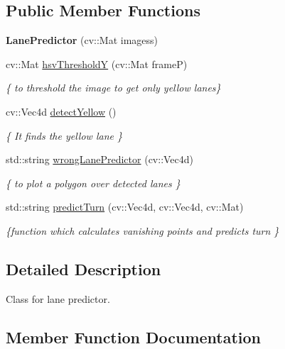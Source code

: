 \subsection*{Public Member Functions}
\begin{DoxyCompactItemize}
\item 
{\bfseries Lane\+Predictor} (cv\+::\+Mat imagess)\hypertarget{classLanePredictor_a57bc13d1b363fad1de2336356377e8ff}{}\label{classLanePredictor_a57bc13d1b363fad1de2336356377e8ff}

\item 
cv\+::\+Mat \hyperlink{classLanePredictor_ada11760da395c1d2f9e6117212659742}{hsv\+ThresholdY} (cv\+::\+Mat frameP)
\begin{DoxyCompactList}\small\item\em \{ to threshold the image to get only yellow lanes\} \end{DoxyCompactList}\item 
cv\+::\+Vec4d \hyperlink{classLanePredictor_a10bd6de18ad3ffb3f10c2385e32dfdee}{detect\+Yellow} ()
\begin{DoxyCompactList}\small\item\em \{ It finds the yellow lane \} \end{DoxyCompactList}\item 
std\+::string \hyperlink{classLanePredictor_ac930fa52cdede9afa25bbf7cafd8c6b5}{wrong\+Lane\+Predictor} (cv\+::\+Vec4d)
\begin{DoxyCompactList}\small\item\em \{ to plot a polygon over detected lanes \} \end{DoxyCompactList}\item 
std\+::string \hyperlink{classLanePredictor_a9b72c2dfa77992f7f8e229c3a67103f7}{predict\+Turn} (cv\+::\+Vec4d, cv\+::\+Vec4d, cv\+::\+Mat)
\begin{DoxyCompactList}\small\item\em \{function which calculates vanishing points and predicts turn \} \end{DoxyCompactList}\end{DoxyCompactItemize}


\subsection{Detailed Description}
Class for lane predictor. 

\subsection{Member Function Documentation}
